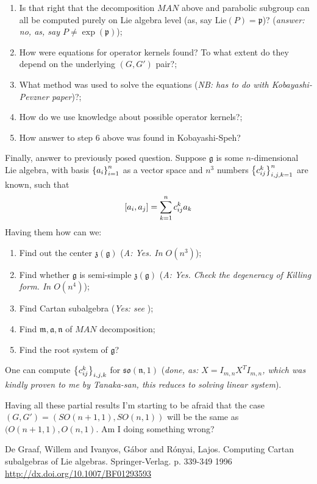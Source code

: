 \documentclass[12pt]{article} %
\begin{document}
\begin{enumerate}
\item Is that right that the decomposition $MAN$ above and parabolic subgroup can all be computed purely on Lie algebra level (as, say
 $\mbox{Lie}(P)=\mathfrak{p}$)? (\textit{answer: no, as, say $P\neq\exp(\mathfrak{p})$});
\item How were equations for operator kernels found? To what extent do they depend on the underlying $(G,G')$ pair?;
\item What method was used to solve the equations (\textit{NB: has to do with Kobayashi-Pevzner paper})?;
\item How do we use knowledge about possible operator kernels?;
\item How answer to step 6 above was found in Kobayashi-Speh?
\end{enumerate}
Finally, answer to previously posed question. Suppose $\mathfrak{g}$ is some $n$-dimensional Lie algebra,
with basis $\left\{a_i\right\}_{i=1}^n$ as a vector space and $n^3$ numbers $\left\{c_{ij}^k\right\}_{i,j,k=1}^n$ are known, such that
\[\mysbra{a_i,a_j}=\sum_{k=1}^nc_{ij}^ka_k\]
Having them how can we:
\begin{enumerate}
\item Find out the center $\mathfrak{z(g)}$ (\textit{A: Yes. In $O(n^3)$});
\item Find whether $\mathfrak{g}$ is semi-simple $\mathfrak{z(g)}$ (\textit{A: Yes. Check the degeneracy of Killing form. In $O(n^4)$});
\item Find Cartan subalgebra (\textit{Yes: see \cite{graaf}});
\item Find $\mathfrak{m},\mathfrak{a},\mathfrak{n}$ of $MAN$ decomposition;
\item Find the root system of $\mathfrak{g}$?
\end{enumerate}
One can compute $\left\{c_{ij}^k\right\}_{i,j,k}$ for $\mathfrak{so(n,1)}$ (\textit{done, as: $X=I_{m,n}X^TI_{m,n}$,
which was kindly proven to me by Tanaka-san, this reduces to solving linear system}).

Having all these partial results I'm starting to be afraid that the case $(G,G')=(SO(n+1,1),SO(n,1))$ will be the same as $(O(n+1,1),O(n,1)$. Am
I doing something wrong?
\begin{thebibliography}{9}
De Graaf, Willem and Ivanyos, Gábor and Rónyai, Lajos. Computing Cartan subalgebras of Lie algebras. Springer-Verlag. p. 339-349 1996
\url{ http://dx.doi.org/10.1007/BF01293593}
\end{thebibliography}
\end{document}
